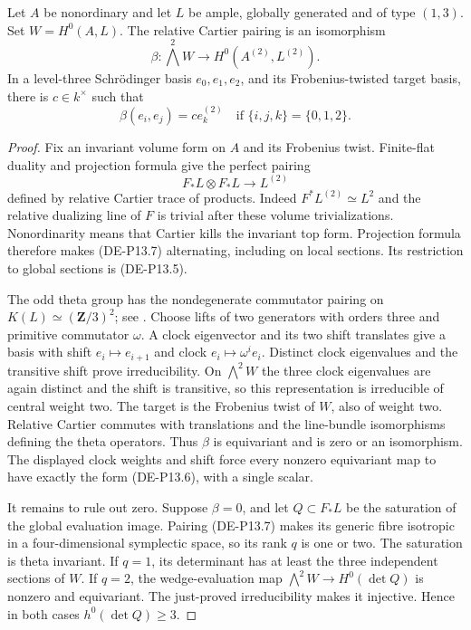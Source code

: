 \begin{lemma}
\label{lem:DE-primitive-one-three-Cartier}
Let \(A\) be nonordinary and let \(L\) be ample, globally
generated and of type \((1,3)\). Set \(W=H^0(A,L)\).
The relative Cartier pairing is an isomorphism
\[
 \beta:\bigwedge^2 W\longrightarrow H^0(A^{(2)},L^{(2)}).
                                                               \tag{DE-P13.5}
\]
In a level-three Schr\"odinger basis \(e_0,e_1,e_2\), and its
Frobenius-twisted target basis, there is \(c\in k^\times\) such that
\[
             \beta(e_i,e_j)=c e_k^{(2)}
             \quad\text{if }\{i,j,k\}=\{0,1,2\}.    \tag{DE-P13.6}
\]
\end{lemma}
\begin{proof}
Fix an invariant volume form on \(A\) and its Frobenius twist.
Finite-flat duality and projection formula give the perfect pairing
\[
          F_*L\otimes F_*L\longrightarrow L^{(2)}
                                                               \tag{DE-P13.7}
\]
defined by relative Cartier trace of products. Indeed
\(F^*L^{(2)}\simeq L^2\) and the relative dualizing line of
\(F\) is trivial after these volume trivializations. Nonordinarity
means that Cartier kills the invariant top form. Projection formula
therefore makes (DE-P13.7) alternating, including on local sections.
Its restriction to global sections is (DE-P13.5).

The odd theta group has the nondegenerate commutator pairing on
\(K(L)\simeq(\mathbf Z/3)^2\); see
\citep[Proposition~8.19 and Corollary~8.20]{EdixhovenVanDerGeerMoonenAV}.
Choose lifts of two generators with orders three and primitive
commutator \(\omega\). A clock eigenvector and its two shift
translates give a basis with shift \(e_i\mapsto e_{i+1}\) and
clock \(e_i\mapsto\omega^i e_i\). Distinct clock eigenvalues
and the transitive shift prove irreducibility. On \(\bigwedge^2W\)
the three clock eigenvalues are again distinct and the shift is
transitive, so this representation is irreducible of central weight
two. The target is the Frobenius twist of \(W\), also of weight
two. Relative Cartier commutes with translations and the line-bundle
isomorphisms defining the theta operators. Thus \(\beta\) is
equivariant and is zero or an isomorphism. The displayed clock
weights and shift force every nonzero equivariant map to have
exactly the form (DE-P13.6), with a single scalar.

It remains to rule out zero. Suppose \(\beta=0\), and let
\(Q\subset F_*L\) be the saturation of the global evaluation
image. Pairing (DE-P13.7) makes its generic fibre isotropic in
a four-dimensional symplectic space, so its rank \(q\) is one
or two. The saturation is theta invariant. If \(q=1\), its
determinant has at least the three independent sections of \(W\).
If \(q=2\), the wedge-evaluation map
\(\bigwedge^2W\to H^0(\det Q)\) is nonzero and equivariant.
The just-proved irreducibility makes it injective. Hence in both
cases \(h^0(\det Q)\ge3\).


\end{proof}
